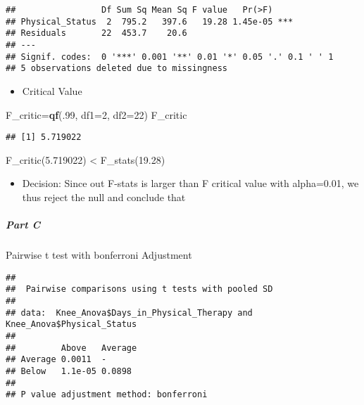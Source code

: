 \documentclass[]{article}
\newenvironment{Shaded}{\begin{snugshade}}{\end{snugshade}}
\newcommand{\DataTypeTok}[1]{\textcolor[rgb]{0.13,0.29,0.53}{#1}}
\newcommand{\DecValTok}[1]{\textcolor[rgb]{0.00,0.00,0.81}{#1}}
\newcommand{\KeywordTok}[1]{\textcolor[rgb]{0.13,0.29,0.53}{\textbf{#1}}}
\newcommand{\NormalTok}[1]{#1}
\newcommand{\OperatorTok}[1]{\textcolor[rgb]{0.81,0.36,0.00}{\textbf{#1}}}
\newcommand{\StringTok}[1]{\textcolor[rgb]{0.31,0.60,0.02}{#1}}
\providecommand{\tightlist}{%
  \setlength{\itemsep}{0pt}\setlength{\parskip}{0pt}}
\let\oldsubparagraph\subparagraph
\renewcommand{\subparagraph}[1]{\oldsubparagraph{#1}\mbox{}}
\begin{document}
\begin{verbatim}
##                 Df Sum Sq Mean Sq F value   Pr(>F)    
## Physical_Status  2  795.2   397.6   19.28 1.45e-05 ***
## Residuals       22  453.7    20.6                     
## ---
## Signif. codes:  0 '***' 0.001 '**' 0.01 '*' 0.05 '.' 0.1 ' ' 1
## 5 observations deleted due to missingness
\end{verbatim}

\begin{itemize}
\tightlist
\item
  Critical Value
\end{itemize}

\begin{Shaded}
\begin{Highlighting}[]
\NormalTok{F_critic=}\KeywordTok{qf}\NormalTok{(.}\DecValTok{99}\NormalTok{, }\DataTypeTok{df1=}\DecValTok{2}\NormalTok{, }\DataTypeTok{df2=}\DecValTok{22}\NormalTok{)}
\NormalTok{F_critic}
\end{Highlighting}
\end{Shaded}

\begin{verbatim}
## [1] 5.719022
\end{verbatim}

F\_critic(5.719022) \textless{} F\_stats(19.28)

\begin{itemize}
\tightlist
\item
  Decision: Since out F-stats is larger than F critical value with
  alpha=0.01, we thus reject the null and conclude that
\end{itemize}

\hypertarget{part-c}{%
\subparagraph{Part C}\label{part-c}}

Pairwise t test with bonferroni Adjustment

\begin{Shaded}
\end{Shaded}

\begin{verbatim}
## 
##  Pairwise comparisons using t tests with pooled SD 
## 
## data:  Knee_Anova$Days_in_Physical_Therapy and Knee_Anova$Physical_Status 
## 
##         Above   Average
## Average 0.0011  -      
## Below   1.1e-05 0.0898 
## 
## P value adjustment method: bonferroni
\end{verbatim}
\end{document}
